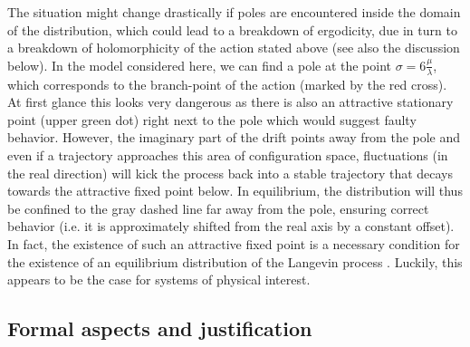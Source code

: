 \documentclass[../main.tex]{subfiles}
\begin{document}
 The situation might change drastically if poles are encountered inside the domain of the distribution, which could lead to a breakdown of ergodicity, due in turn to a breakdown of holomorphicity of the action stated above (see also the discussion below). In the model considered here, we can find a pole at the point $\sigma = 6\tfrac{\mu}{\lambda}$, which corresponds to the branch-point of the action (marked by the red cross). At first glance this looks very dangerous as there is also an attractive stationary point (upper green dot) right next to the pole which would suggest faulty behavior. However, the imaginary part of the drift points away from the pole and even if a trajectory approaches this area of configuration space, fluctuations (in the real direction) will kick the process back into a stable trajectory that decays towards the attractive fixed point below. In equilibrium, the distribution will thus be confined to the gray dashed line far away from the pole, ensuring correct behavior (i.e. it is approximately shifted from the real axis by a constant offset). In fact, the existence of such an attractive fixed point is a necessary condition for the existence of an equilibrium distribution of the Langevin process \cite{CLZeroesFermionDet,Seiler2017StatusOfCL}. Luckily, this appears to be the case for systems of physical interest.




\subsection{Formal aspects and justification}
\end{document}
